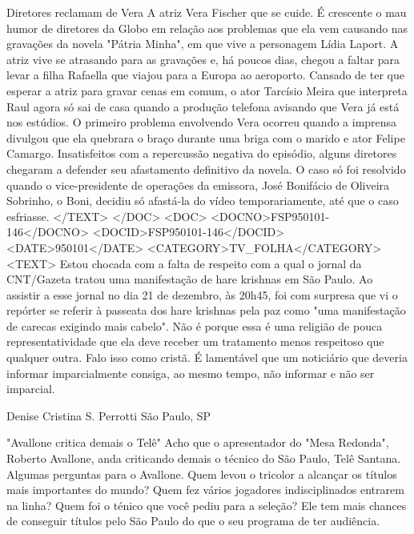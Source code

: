 Diretores reclamam de Vera 
A atriz Vera Fischer que se cuide. É crescente o mau humor de diretores da Globo em relação aos problemas que ela vem causando nas gravações da novela "Pátria Minha", em que vive a personagem Lídia Laport. A atriz vive se atrasando para as gravações e, há poucos dias, chegou a faltar para levar a filha Rafaella que viajou para a Europa ao aeroporto. Cansado de ter que esperar a atriz para gravar cenas em comum, o ator Tarcísio Meira que interpreta Raul agora só sai de casa quando a produção telefona avisando que Vera já está nos estúdios. O primeiro problema envolvendo Vera ocorreu quando a imprensa divulgou que ela quebrara o braço durante uma briga com o marido e ator Felipe Camargo. Insatisfeitos com a repercussão negativa do episódio, alguns diretores chegaram a defender seu afastamento definitivo da novela. O caso só foi resolvido quando o vice-presidente de operações da emissora, José Bonifácio de Oliveira Sobrinho, o Boni, decidiu só afastá-la do vídeo temporariamente, até que o caso esfriasse.
</TEXT>
</DOC>
<DOC>
<DOCNO>FSP950101-146</DOCNO>
<DOCID>FSP950101-146</DOCID>
<DATE>950101</DATE>
<CATEGORY>TV_FOLHA</CATEGORY>
<TEXT>
Estou chocada com a falta de respeito com a qual o jornal da CNT/Gazeta tratou uma manifestação de hare krishnas em São Paulo. Ao assistir a esse jornal no dia 21 de dezembro, às 20h45, foi com surpresa que vi o repórter se referir à passeata dos hare krishnas pela paz como "uma manifestação de carecas exigindo mais cabelo". Não é porque essa é uma religião de pouca representatividade que ela deve receber um tratamento menos respeitoso que qualquer outra. Falo isso como cristã. É lamentável que um noticiário que deveria informar imparcialmente consiga, ao mesmo tempo, não informar e não ser imparcial.

Denise Cristina S. Perrotti São Paulo, SP  

"Avallone critica demais o Telê" 
Acho que o apresentador do "Mesa Redonda", Roberto Avallone, anda criticando demais o técnico do São Paulo, Telê Santana. Algumas perguntas para o Avallone. Quem levou o tricolor a alcançar os títulos mais importantes do mundo? Quem fez vários jogadores indisciplinados entrarem na linha? Quem foi o ténico que você pediu para a seleção? Ele tem mais chances de conseguir títulos pelo São Paulo do que o seu programa de ter audiência.


